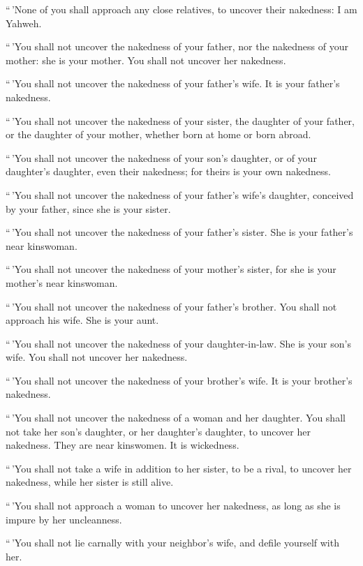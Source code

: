  ``\,'None of you shall approach any close relatives, to
uncover their nakedness: I am Yahweh.

 ``\,'You shall not uncover the nakedness of your father,
nor the nakedness of your mother: she is your mother. You shall not
uncover her nakedness.

 ``\,'You shall not uncover the nakedness of your father's
wife. It is your father's nakedness.

 ``\,'You shall not uncover the nakedness of your sister,
the daughter of your father, or the daughter of your mother, whether
born at home or born abroad.

 ``\,'You shall not uncover the nakedness of your son's
daughter, or of your daughter's daughter, even their nakedness; for
theirs is your own nakedness.

 ``\,'You shall not uncover the nakedness of your
father's wife's daughter, conceived by your father, since she is your
sister.

 ``\,'You shall not uncover the nakedness of your
father's sister. She is your father's near kinswoman.

 ``\,'You shall not uncover the nakedness of your
mother's sister, for she is your mother's near kinswoman.

 ``\,'You shall not uncover the nakedness of your
father's brother. You shall not approach his wife. She is your aunt.

 ``\,'You shall not uncover the nakedness of your
daughter-in-law. She is your son's wife. You shall not uncover her
nakedness.

 ``\,'You shall not uncover the nakedness of your
brother's wife. It is your brother's nakedness.

 ``\,'You shall not uncover the nakedness of a woman and
her daughter. You shall not take her son's daughter, or her daughter's
daughter, to uncover her nakedness. They are near kinswomen. It is
wickedness.

 ``\,'You shall not take a wife in addition to her
sister, to be a rival, to uncover her nakedness, while her sister is
still alive.

 ``\,'You shall not approach a woman to uncover her
nakedness, as long as she is impure by her uncleanness.

 ``\,'You shall not lie carnally with your neighbor's
wife, and defile yourself with her.

